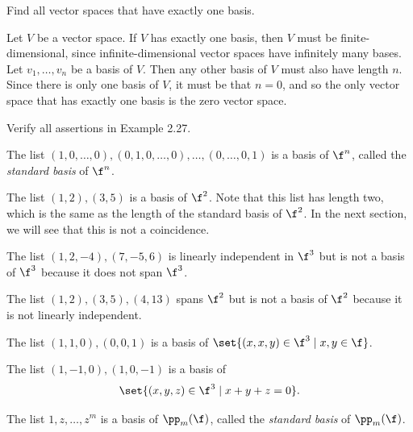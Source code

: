 \begin{exercise}[2b1]
    Find all vector spaces that have exactly one basis.
\end{exercise}

\begin{sol}
    Let $V$ be a vector space. If $V$ has exactly one basis, then $V$ must be finite-dimensional, since infinite-dimensional vector spaces have infinitely many bases. Let $v_1, \ldots, v_n$ be a basis of $V$. Then any other basis of $V$ must also have length $n$. Since there is only one basis of $V$, it must be that $n = 0$, and so the only vector space that has exactly one basis is the zero vector space.
\end{sol}

\begin{exercise}[2b2]
    Verify all assertions in Example 2.27.
    \begin{subexercises}
        \item The list $(1, 0, \ldots, 0), (0, 1, 0, \ldots, 0), \ldots, (0, \ldots, 0, 1)$ is a basis of $\f^n$, called the \emph{standard basis} of $\f^n$.
        \item The list $(1, 2), (3, 5)$ is a basis of $\f^2$. Note that this list has length two, which is the same as the length of the standard basis of $\f^2$. In the next section, we will see that this is not a coincidence.
        \item The list $(1, 2, -4), (7, -5, 6)$ is linearly independent in $\f^3$ but is not a basis of $\f^3$ because it does not span $\f^3$.
        \item The list $(1, 2), (3, 5), (4, 13)$ spans $\f^2$ but is not a basis of $\f^2$ because it is not linearly independent.
        \item The list $(1, 1, 0), (0, 0, 1)$ is a basis of $\set{(x, x, y) \in \f^3 \mid x, y \in \f}$.
        \item The list $(1, -1, 0), (1, 0, -1)$ is a basis of
        \[\set{(x, y, z) \in \f^3 \mid x + y + z = 0}.\]
        \item The list $1, z, \ldots, z^m$ is a basis of $\pp_m(\f)$, called the \emph{standard basis} of $\pp_m(\f)$.
    \end{subexercises}
\end{exercise}

